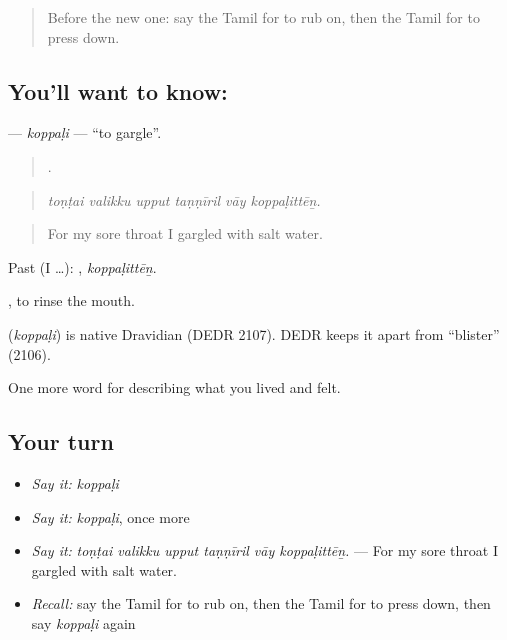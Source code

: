 \label{lesson:TA-C486-koppali}



\begin{quote}
Before the new one: say the Tamil for to rub on, then the Tamil for to press down.
\end{quote}

\subsection*{You'll want to know: }
\textbf{} — \emph{koppaḷi} — \textquotedblleft{}to gargle\textquotedblright{}.

\begin{quote}
     .
\end{quote}

\begin{quote}
\emph{toṇṭai valikku upput taṇṇīril vāy koppaḷittēṉ.}
\end{quote}

\begin{quote}
For my sore throat I gargled with salt water.
\end{quote}

Past (I …): , \emph{koppaḷittēṉ}.

 , to rinse the mouth.

\begin{cousinweb}
\textbf{} (\emph{koppaḷi}) is native Dravidian (DEDR 2107). DEDR keeps it apart from  \textquotedblleft{}blister\textquotedblright{} (2106).
\end{cousinweb}

\begin{grammarlens}[title={What you've built}]
One more word for describing what you lived and felt.
\end{grammarlens}

\subsection*{Your turn}
\begin{itemize}
\raggedright
  \item \emph{Say it:} \emph{koppaḷi}
  \item \emph{Say it:} \emph{koppaḷi}, once more
  \item \emph{Say it:} \emph{toṇṭai valikku upput taṇṇīril vāy koppaḷittēṉ.} — For my sore throat I gargled with salt water.
  \item \emph{Recall:} say the Tamil for to rub on, then the Tamil for to press down, then say \emph{koppaḷi} again
\end{itemize}


